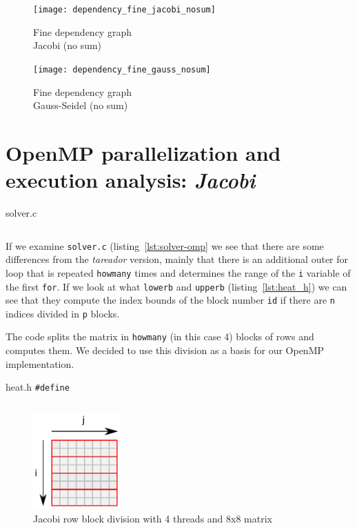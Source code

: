 \begin{figure}[H]
    \begin{minipage}{0.5\textwidth}
        \centering
        \texttt{[image: dependency\_fine\_jacobi\_nosum]}
        \caption{Fine dependency graph \\ Jacobi (no sum)}%
        \label{fig:dependency_fine_jacobi_nosum}
    \end{minipage}
    \begin{minipage}{0.5\textwidth}
        \centering
        \texttt{[image: dependency\_fine\_gauss\_nosum]}
        \caption{Fine dependency graph \\ Gauss-Seidel (no sum)}%
        \label{fig:dependency_fine_gauss_nosum}
    \end{minipage}
\end{figure}

\pagebreak
\section{OpenMP parallelization and execution analysis: \emph{Jacobi}}

\begin{listing}[H]
    \caption{solver.c}%
    \label{lst:solver-omp}
    \inputminted[firstline=17,lastline=39]{c}{code/solver-omp-orig.c}
\end{listing}

If we examine \texttt{solver.c} (listing~\ref{lst:solver-omp} we see that there are some differences 
from the \emph{tareador} version,
mainly that there is an additional outer for loop that is repeated \texttt{howmany} times and determines the
range of the \texttt{i} variable of the first \texttt{for}. If we look at what \texttt{lowerb} and
\texttt{upperb} (listing~\ref{lst:heat_h}) we can see that they compute the index bounds of the block
number \texttt{id} if there are \texttt{n} indices divided in \texttt{p} blocks.

The code splits the matrix in \texttt{howmany} (in this case 4) blocks of rows and computes them.
We decided to use this division as a basis for our OpenMP implementation.

\begin{listing}[H]
    \caption{heat.h \texttt{\#define}}%
    \label{lst:heat_h}
    \inputminted[firstline=59,lastline=61]{c}{code/heat.h}
\end{listing}


\begin{figure}[H]
    \centering
    \includegraphics[width=0.3\textwidth]{jacobi_blocks}
    \caption{Jacobi row block division with 4 threads and 8x8 matrix}%
    \label{fig:blocks-jacobi}
\end{figure}

